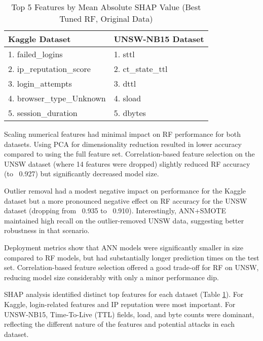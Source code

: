 \documentclass[sigconf,screen,final,nonacm]{acmart}
\begin{document}
\begin{table}[ht]
  \caption{Top 5 Features by Mean Absolute SHAP Value (Best Tuned RF, Original Data)}
  \label{tab:shap_features}
  \centering
  \small
  \begin{tabular}{l l}
    \toprule
    \textbf{Kaggle Dataset} & \textbf{UNSW-NB15 Dataset} \\
    \midrule
    1. failed\_logins       & 1. sttl \\
    2. ip\_reputation\_score & 2. ct\_state\_ttl \\
    3. login\_attempts      & 3. dttl \\
    4. browser\_type\_Unknown & 4. sload \\
    5. session\_duration    & 5. dbytes \\
    \bottomrule
  \end{tabular}
\end{table}

Scaling numerical features had minimal impact on RF performance for both datasets. Using PCA for dimensionality reduction resulted in lower accuracy compared to using the full feature set. Correlation-based feature selection on the UNSW dataset (where 14 features were dropped) slightly reduced RF accuracy (to ~0.927) but significantly decreased model size.

Outlier removal had a modest negative impact on performance for the Kaggle dataset but a more pronounced negative effect on RF accuracy for the UNSW dataset (dropping from ~0.935 to ~0.910). Interestingly, ANN+SMOTE maintained high recall on the outlier-removed UNSW data, suggesting better robustness in that scenario.

Deployment metrics show that ANN models were significantly smaller in size compared to RF models, but had substantially longer prediction times on the test set. Correlation-based feature selection offered a good trade-off for RF on UNSW, reducing model size considerably with only a minor performance dip.

SHAP analysis identified distinct top features for each dataset (Table \ref{tab:shap_features}). For Kaggle, login-related features and IP reputation were most important. For UNSW-NB15, Time-To-Live (TTL) fields, load, and byte counts were dominant, reflecting the different nature of the features and potential attacks in each dataset.
\end{document}
